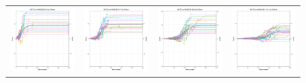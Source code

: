 \begin{figure}
\centering
\begin{tabular}{cccc}
\hspace{-0.5cm}\includegraphics[width = 1.55in]{images/Visualizations/MCTSvsRANDOM/500ms5x5.png} &
\hspace{-0.5cm}\includegraphics[width = 1.55in]{images/Visualizations/MCTSvsRANDOM/500ms7x7.png} &
\hspace{-0.5cm}\includegraphics[width = 1.55in]{images/Visualizations/MCTSvsRANDOM/500ms9x9.png} &
\hspace{-0.5cm}\includegraphics[width = 1.55in]{images/Visualizations/MCTSvsRANDOM/500ms11x11.png} \\


\end{tabular}
\end{figure}

